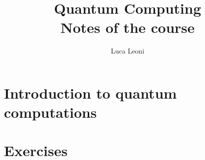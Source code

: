 \documentclass[12pt]{report}
\title{\Huge{Quantum Computing}\\Notes of the course}
\author{\huge{Luca Leoni}}
\date{}
\begin{document}
    \maketitle

    \tableofcontents

    \chapter{Introduction to quantum computations}
    
    
    
    
    
    
    

    \chapter{Exercises}
    
    
\end{document}
